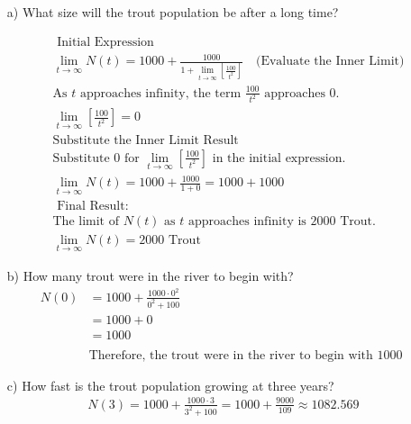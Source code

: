 \documentclass{article}
\newenvironment{solution}{\color{solutioncolor}}{}
\begin{document}
\begin{enumerate}
    \item[a)] What size will the trout population be after a long time?
    \begin{solution}

\begin{align*}
& \text{ Initial Expression} \\
& \lim_{t \rightarrow \infty} N(t) = 1000 + \frac{1000}{1 + \lim_{t \rightarrow \infty} \left[\frac{100}{t^2}\right]} \quad \text{(Evaluate the Inner Limit)}  \\
& \text{As } t \text{ approaches infinity, the term } \frac{100}{t^2} \text{ approaches 0.} \\
& \lim_{t \rightarrow \infty} \left[\frac{100}{t^2}\right] = 0 \\
& \text{Substitute the Inner Limit Result} \\
& \text{Substitute 0 for } \lim_{t \rightarrow \infty} \left[\frac{100}{t^2}\right] \text{ in the initial expression.} \\
& \lim_{t \rightarrow \infty} N(t) = 1000 + \frac{1000}{1 + 0} = 1000 + 1000 \\
& \text{ Final Result:} \\
& \text{The limit of } N(t) \text{ as } t \text{ approaches infinity is 2000 Trout.} \\
& \lim_{t \rightarrow \infty} N(t) = 2000 \text{ Trout}
\end{align*}



    \end{solution}

    \item[b)] How many trout were in the river to begin with?
\begin{solution}
    \begin{align*}
        N(0) &= 1000 + \frac{1000 \cdot 0^2}{0^2 + 100} \\
             &= 1000 + 0 \\
             &= 1000\\\\
        &\text{Therefore, the trout were in the river to begin with 1000  }     
    \end{align*}
\end{solution}
    \item[c)] How fast is the trout population growing at three years?
    \begin{solution}
    \begin{align*}
       N(3)=1000+\frac{1000 \cdot 3}{3^2+100}=1000+\frac{9000}{109} \approx 1082.569
    \end{align*}
\end{solution}


\end{enumerate}
\end{document}
